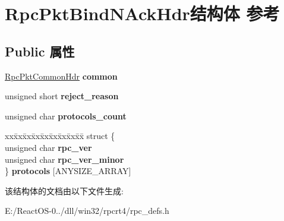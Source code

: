 \hypertarget{struct_rpc_pkt_bind_n_ack_hdr}{}\section{Rpc\+Pkt\+Bind\+N\+Ack\+Hdr结构体 参考}
\label{struct_rpc_pkt_bind_n_ack_hdr}
\subsection*{Public 属性}
\begin{DoxyCompactItemize}
\item 
\mbox{\label{struct_rpc_pkt_bind_n_ack_hdr_a2b0301cd7d3599d262e082b7e21e3782}} 
\hyperlink{struct_rpc_pkt_common_hdr}{Rpc\+Pkt\+Common\+Hdr} {\bfseries common}
\item 
\mbox{\label{struct_rpc_pkt_bind_n_ack_hdr_a08e45b5285809e183c754f117172764b}} 
unsigned short {\bfseries reject\+\_\+reason}
\item 
\mbox{\label{struct_rpc_pkt_bind_n_ack_hdr_a286d200ae714913bae5d82d3d9fec83c}} 
unsigned char {\bfseries protocols\+\_\+count}
\item 
\mbox{\label{struct_rpc_pkt_bind_n_ack_hdr_adc0e754b32203e45bc4080e88db8b6a3}} 
\begin{tabbing}
xx\=xx\=xx\=xx\=xx\=xx\=xx\=xx\=xx\=\kill
struct \{\\
\>unsigned char {\bfseries rpc\_ver}\\
\>unsigned char {\bfseries rpc\_ver\_minor}\\
\} {\bfseries protocols} \mbox{[}ANYSIZE\_ARRAY\mbox{]}\\

\end{tabbing}\end{DoxyCompactItemize}


该结构体的文档由以下文件生成\+:\begin{DoxyCompactItemize}
\item 
E\+:/\+React\+O\+S-\/0../dll/win32/rpcrt4/rpc\+\_\+defs.\+h\end{DoxyCompactItemize}
